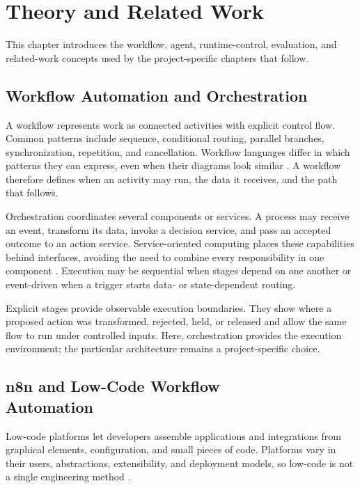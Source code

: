 \appto\bibsetup{\setlength{\emergencystretch}{3em}}
\begingroup
\setlength{\emergencystretch}{2em}

\section{Theory and Related Work}\label{sec:theory}

This chapter introduces the workflow, agent, runtime-control, evaluation, and
related-work concepts used by the project-specific chapters that follow.

\subsection{Workflow Automation and Orchestration}\label{subsec:theory-workflow}

A workflow represents work as connected activities with explicit control flow.
Common patterns include sequence, conditional routing, parallel branches,
synchronization, repetition, and cancellation. Workflow languages differ in
which patterns they can express, even when their diagrams look similar
\cite{vanderaalst2003workflowpatterns}. A workflow therefore defines when an
activity may run, the data it receives, and the path that follows.

Orchestration coordinates several components or services. A process may receive
an event, transform its data, invoke a decision service, and pass an accepted
outcome to an action service. Service-oriented computing places these
capabilities behind interfaces, avoiding the need to combine every
responsibility in one component \cite{papazoglou2003serviceoriented}. Execution
may be sequential when stages depend on one another or event-driven when a
trigger starts data- or state-dependent routing.

Explicit stages provide observable execution boundaries. They show where a
proposed action was transformed, rejected, held, or released and allow the same
flow to run under controlled inputs. Here, orchestration provides the execution
environment; the particular architecture remains a project-specific choice.

\subsection[n8n and Low-Code Workflow Automation]{n8n and Low-Code Workflow\\Automation}\label{subsec:theory-n8n}

Low-code platforms let developers assemble applications and integrations from
graphical elements, configuration, and small pieces of code. Platforms vary in
their users, abstractions, extensibility, and deployment models, so low-code is
not a single engineering method \cite{bock2021lowcode}.

